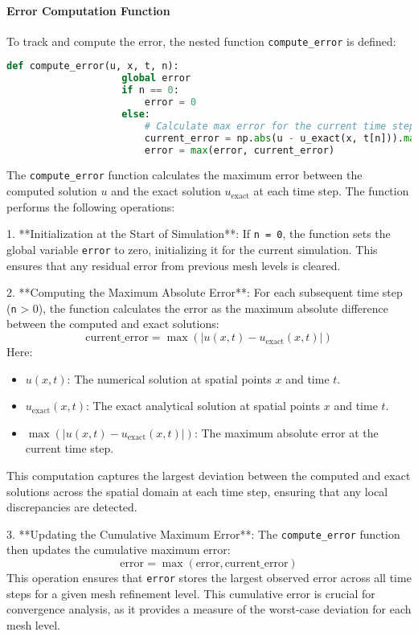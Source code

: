 \documentclass{article}
\begin{document}
			\paragraph{Error Computation Function}
			
			To track and compute the error, the nested function \texttt{compute\_error} is defined:
			
			\begin{lstlisting}[language=Python]
				def compute_error(u, x, t, n):
					global error
					if n == 0:
						error = 0
					else:
						# Calculate max error for the current time step
						current_error = np.abs(u - u_exact(x, t[n])).max()
						error = max(error, current_error)
			\end{lstlisting}
			
			The \texttt{compute\_error} function calculates the maximum error between the computed solution \( u \) and the exact solution \( u_{\text{exact}} \) at each time step. The function performs the following operations:
			
			1. **Initialization at the Start of Simulation**:
			If \texttt{n = 0}, the function sets the global variable \texttt{error} to zero, initializing it for the current simulation. This ensures that any residual error from previous mesh levels is cleared.
			
			2. **Computing the Maximum Absolute Error**:
			For each subsequent time step (\texttt{n} > 0), the function calculates the error as the maximum absolute difference between the computed and exact solutions:
			\[
			\text{current\_error} = \max \left( |u(x, t) - u_{\text{exact}}(x, t)| \right)
			\]
			Here:
			\begin{itemize}
				\item \( u(x, t) \): The numerical solution at spatial points \( x \) and time \( t \).
				\item \( u_{\text{exact}}(x, t) \): The exact analytical solution at spatial points \( x \) and time \( t \).
				\item \( \max \left( |u(x, t) - u_{\text{exact}}(x, t)| \right) \): The maximum absolute error at the current time step.
			\end{itemize}
			This computation captures the largest deviation between the computed and exact solutions across the spatial domain at each time step, ensuring that any local discrepancies are detected.
			
			3. **Updating the Cumulative Maximum Error**:
			The \texttt{compute\_error} function then updates the cumulative maximum error:
			\[
			\text{error} = \max(\text{error}, \text{current\_error})
			\]
			This operation ensures that \texttt{error} stores the largest observed error across all time steps for a given mesh refinement level. This cumulative error is crucial for convergence analysis, as it provides a measure of the worst-case deviation for each mesh level.
			
\end{document}

